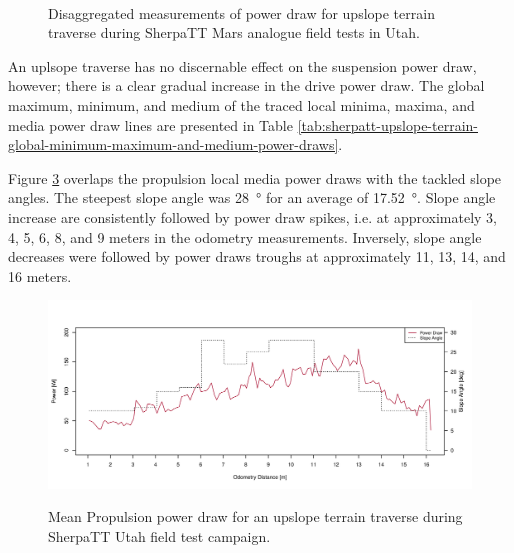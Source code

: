\begin{figure}[h]
\begin{subfigure}[t]{\subfigureWidth}
		\label{fig:plot:sub:sherpatt-disaggregated-upslope-terrain-power-draw-suspension}
	\end{subfigure}\\[0.8ex]
    \caption[Disaggregated measurements of power draw for upslope terrain traverse during SherpaTT Mars analogue field tests in Utah]
            {Disaggregated measurements of power draw for upslope terrain traverse during SherpaTT Mars analogue field tests in Utah.}
    \label{fig:plot:sherpatt-disaggregated-upslope-terrain-power-draw}
\vspace{-2ex}
\end{figure}

An uplsope traverse has no discernable effect on the suspension power draw, however; there is a clear gradual increase in the drive power draw. The global maximum, minimum, and medium of the traced local minima, maxima, and media power draw lines are presented in Table \ref{tab:sherpatt-upslope-terrain-global-minimum-maximum-and-medium-power-draws}.

\clearpage


Figure \ref{fig:plot:sherpatt-upslope-terrain-power-draw} overlaps the propulsion local media power draws with the tackled slope angles. The steepest slope angle was \SI{28}{\degree} for an average of \SI{17.52}{\degree}. Slope angle increase are consistently followed by power draw spikes, i.e. at approximately 3, 4, 5, 6, 8, and 9 meters in the odometry measurements. Inversely, slope angle decreases were followed by power draws troughs at approximately 11, 13, 14, and 16 meters.

\begin{figure}[h]
  \centering
  \hypersetup{linkcolor=captionTextColor}
  \includegraphics[width=0.8\linewidth]{sections/locomotion-power-draws/plots/minima-locomotion-power-draws-on-upslope-terrain.png}\\
  \caption[Mean Propulsion power draw for an upslope terrain traverse during SherpaTT Utah field test campaign.]
          {Mean Propulsion power draw for an upslope terrain traverse during SherpaTT Utah field test campaign.}
  \label{fig:plot:sherpatt-upslope-terrain-power-draw}
\end{figure}

